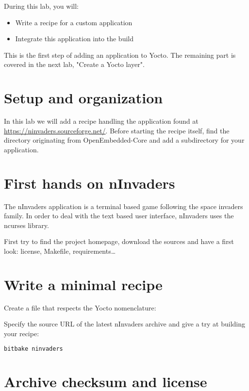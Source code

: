 
During this lab, you will:
\begin{itemize}
  \item Write a recipe for a custom application
  \item Integrate this application into the build
\end{itemize}

This is the first step of adding an application to Yocto. The
remaining part is covered in the next lab, "Create a Yocto layer".

\section{Setup and organization}

In this lab we will add a recipe handling the  application
found at \url{https://ninvaders.sourceforge.net/}. Before starting the recipe
itself, find the  directory originating from
OpenEmbedded-Core and add a subdirectory for your application.

\section{First hands on nInvaders}

The nInvaders application is a terminal based game following the space invaders
family. In order to deal with the text based user interface, nInvaders uses the
ncurses library.

First try to find the project homepage, download the sources and have a first
look: license, Makefile, requirements\dots

\section{Write a minimal recipe}

Create a file that respects the Yocto nomenclature: 

Specify the source URL of the latest nInvaders archive and give a try at
building your recipe:

\begin{verbatim}
bitbake ninvaders
\end{verbatim}

\section{Archive checksum and license}

